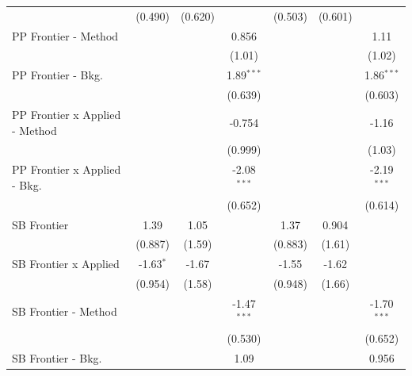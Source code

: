 \begin{tabular}{lcccccc}
                                  & (0.490)        & (0.620)        &               & (0.503)        & (0.601)       &   \\   
   PP Frontier - Method           &                &                & 0.856         &                &               & 1.11\\   
                                  &                &                & (1.01)        &                &               & (1.02)\\   
   PP Frontier - Bkg.             &                &                & 1.89$^{***}$  &                &               & 1.86$^{***}$\\   
                                  &                &                & (0.639)       &                &               & (0.603)\\   
   PP Frontier x Applied - Method &                &                & -0.754        &                &               & -1.16\\   
                                  &                &                & (0.999)       &                &               & (1.03)\\   
   PP Frontier x Applied - Bkg.   &                &                & -2.08$^{***}$ &                &               & -2.19$^{***}$\\   
                                  &                &                & (0.652)       &                &               & (0.614)\\   
   SB Frontier                    & 1.39           & 1.05           &               & 1.37           & 0.904         &   \\   
                                  & (0.887)        & (1.59)         &               & (0.883)        & (1.61)        &   \\   
   SB Frontier x Applied          & -1.63$^{*}$    & -1.67          &               & -1.55          & -1.62         &   \\   
                                  & (0.954)        & (1.58)         &               & (0.948)        & (1.66)        &   \\   
   SB Frontier - Method           &                &                & -1.47$^{***}$ &                &               & -1.70$^{***}$\\   
                                  &                &                & (0.530)       &                &               & (0.652)\\   
   SB Frontier - Bkg.             &                &                & 1.09          &                &               & 0.956\\   

\end{tabular}
